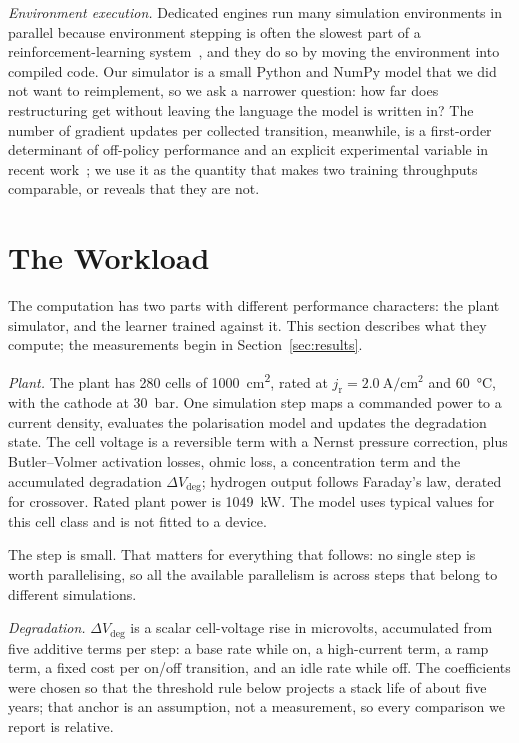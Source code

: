 \documentclass[conference]{IEEEtran}
\newcommand{\dVdeg}{\Delta V_{\mathrm{deg}}}
\begin{document}
\emph{Environment execution.} Dedicated engines run many simulation environments in parallel because environment
stepping is often the slowest part of a reinforcement-learning system~\cite{weng2022envpool}, and they do so by
moving the environment into compiled code. Our simulator is a small Python and NumPy model that we did not want to
reimplement, so we ask a narrower question: how far does restructuring get without leaving the language the model
is written in? The number of gradient updates per collected transition, meanwhile, is a first-order determinant of
off-policy performance and an explicit experimental variable in recent
work~\cite{fedus2020replay,chen2021redq,doro2023replay}; we use it as the quantity that makes two training
throughputs comparable, or reveals that they are not.

\section{The Workload}\label{sec:workload}
The computation has two parts with different performance characters: the plant simulator, and the learner trained
against it. This section describes what they compute; the measurements begin in Section~\ref{sec:results}.

\emph{Plant.} The plant has 280 cells of \SI{1000}{\centi\meter\squared}, rated at
$j_\mathrm{r}=\SI{2.0}{\ampere\per\centi\meter\squared}$ and \SI{60}{\celsius}, with the cathode at \SI{30}{\bar}.
One simulation step maps a commanded power to a current density, evaluates the polarisation model and updates the
degradation state. The cell voltage is a reversible term with a Nernst pressure correction, plus Butler--Volmer
activation losses, ohmic loss, a concentration term and the accumulated degradation $\dVdeg$; hydrogen output
follows Faraday's law, derated for crossover. Rated plant power is \SI{1049}{\kilo\watt}. The model uses typical
values for this cell class and is not fitted to a device.

The step is small. That matters for everything that follows: no single step is worth parallelising, so all the
available parallelism is across steps that belong to different simulations.

\emph{Degradation.} $\dVdeg$ is a scalar cell-voltage rise in microvolts, accumulated from five additive terms per
step: a base rate while on, a high-current term, a ramp term, a fixed cost per on/off transition, and an idle rate
while off. The coefficients were chosen so that the threshold rule below projects a stack life of about five
years; that anchor is an assumption, not a measurement, so every comparison we report is relative.
\end{document}
